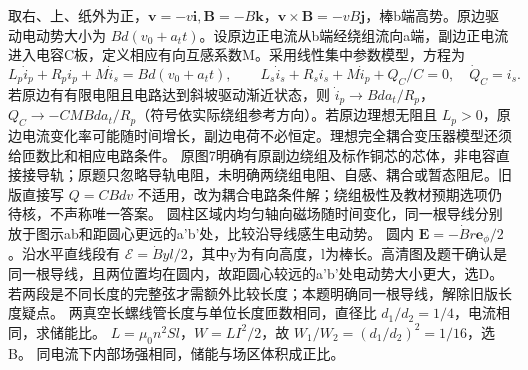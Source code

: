 \workings 取右、上、纸外为正，$\bm v=-v\bm i,\bm B=-B\bm k$，$\bm v\times\bm B=-vB\bm j$，棒b端高势。原边驱动电动势大小为 $Bd(v_0+a_t t)$。设原边正电流从b端经绕组流向a端，副边正电流进入电容C板，定义相应有向互感系数M。采用线性集中参数模型，方程为
\[
L_p\dot i_p+R_p i_p+M\dot i_s=Bd(v_0+a_t t),\qquad
L_s\dot i_s+R_s i_s+M\dot i_p+Q_C/C=0,\quad \dot Q_C=i_s .
\]
若原边有有限电阻且电路达到斜坡驱动渐近状态，则 $\dot i_p\to Bda_t/R_p$，$Q_C\to-CM Bda_t/R_p$（符号依实际绕组参考方向）。若原边理想无阻且 $L_p>0$，原边电流变化率可能随时间增长，副边电荷不必恒定。理想完全耦合变压器模型还须给匝数比和相应电路条件。
\crosscheck 原图7明确有原副边绕组及标作铜芯的芯体，非电容直接接导轨；原题只忽略导轨电阻，未明确两绕组电阻、自感、耦合或暂态阻尼。旧版直接写 $Q=CBdv$ 不适用，改为耦合电路条件解；绕组极性及教材预期选项仍待核，不声称唯一答案。
\problemtext 圆柱区域内均匀轴向磁场随时间变化，同一根导线分别放于图示ab和距圆心更远的a'b'处，比较沿导线感生电动势。
\workings 圆内 $\bm E=-\dot B r\bm e_\phi/2$。沿水平直线段有 $\mathcal E=\dot B yl/2$，其中y为有向高度，l为棒长。高清图及题干确认是同一根导线，且两位置均在圆内，故距圆心较远的a'b'处电动势大小更大，选D。
\crosscheck 若两段是不同长度的完整弦才需额外比较长度；本题明确同一根导线，解除旧版长度疑点。
\problemtext 两真空长螺线管长度与单位长度匝数相同，直径比 $d_1/d_2=1/4$，电流相同，求储能比。
\workings $L=\mu_0n^2Sl$，$W=LI^2/2$，故 $W_1/W_2=(d_1/d_2)^2=1/16$，选B。
\crosscheck 同电流下内部场强相同，储能与场区体积成正比。

